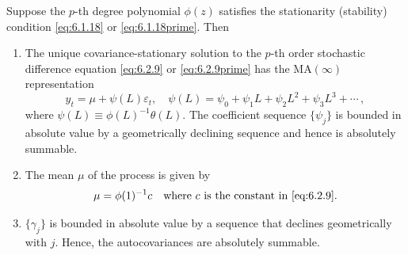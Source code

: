 \begin{proposition}
\label{prop:6.5}
Suppose the $p$-th degree polynomial $\phi(z)$ satisfies the stationarity (stability)
condition \eqref{eq:6.1.18} or \eqref{eq:6.1.18prime}. Then
\begin{enumerate}[label=(\alph*)]
\item The unique covariance-stationary solution to the $p$-th order stochastic difference
equation \eqref{eq:6.2.9} or \eqref{eq:6.2.9prime} has the $\mathrm{MA}(\infty)$ representation
\begin{equation}
  y_t = \mu + \psi(L) \varepsilon_t, \quad
  \psi(L) = \psi_0 + \psi_1 L + \psi_2 L^2 + \psi_3 L^3 + \cdots\,,
  \label{eq:6.2.10}
\end{equation}
where $\psi(L) \equiv \phi(L)^{-1} \theta(L)$. The coefficient sequence $\{\psi_j\}$ is bounded in
absolute value by a geometrically declining sequence and hence is absolutely
summable.

\item The mean $\mu$ of the process is given by
\begin{equation}
  \mu = \phi(1)^{-1} c \quad \text{where $c$ is the constant in \eqref{eq:6.2.9}.}
  \label{eq:6.2.11}
\end{equation}

\item $\{\gamma_j\}$ is bounded in absolute value by a sequence that declines geometrically
with $j$. Hence, the autocovariances are absolutely summable.
\end{enumerate}
\end{proposition}


